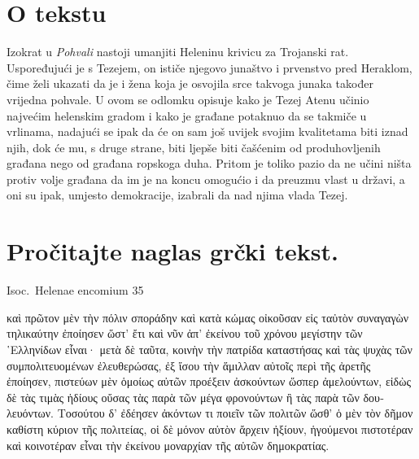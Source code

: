 


\section*{O tekstu}

Izokrat u \textit{Pohvali} nastoji umanjiti Heleninu krivicu za Trojanski rat. Uspoređujući je s Tezejem, on ističe njegovo junaštvo i prvenstvo pred Heraklom, čime želi ukazati da je i žena koja je osvojila srce takvoga junaka također vrijedna pohvale. U ovom se odlomku opisuje kako je Tezej Atenu učinio najvećim helenskim gradom i kako je građane potaknuo da se takmiče u vrlinama, nadajući se ipak da će on sam još uvijek svojim kvalitetama biti iznad njih, dok će mu, s druge strane, biti ljepše biti čašćenim od produhovljenih građana nego od građana ropskoga duha. Pritom je toliko pazio da ne učini ništa protiv volje građana da im je na koncu  omogućio i da preuzmu vlast u državi, a oni su ipak, umjesto demokracije, izabrali da nad njima vlada Tezej.


\section*{Pročitajte naglas grčki tekst.}

Isoc.\ Helenae encomium 35


\medskip

\begin{greek}
{\large

\noindent καὶ πρῶτον μὲν τὴν πόλιν σποράδην καὶ κατὰ κώμας οἰκοῦσαν εἰς ταὐτὸν συναγαγὼν τηλικαύτην ἐποίησεν ὥστ' ἔτι καὶ νῦν ἀπ' ἐκείνου τοῦ χρόνου μεγίστην τῶν ῾Ελληνίδων εἶναι· μετὰ δὲ ταῦτα, κοινὴν τὴν πατρίδα καταστήσας καὶ τὰς ψυχὰς τῶν συμπολιτευομένων ἐλευθερώσας, ἐξ ἴσου τὴν ἅμιλλαν αὐτοῖς περὶ τῆς ἀρετῆς ἐποίησεν, πιστεύων μὲν ὁμοίως αὐτῶν προέξειν ἀσκούντων ὥσπερ ἀμελούντων, εἰδὼς δὲ τὰς τιμὰς ἡδίους οὔσας τὰς παρὰ τῶν μέγα φρονούντων ἢ τὰς παρὰ τῶν δουλευόντων. Τοσούτου δ' ἐδέησεν ἀκόντων τι ποιεῖν τῶν πολιτῶν ὥσθ' ὁ μὲν τὸν δῆμον καθίστη κύριον τῆς πολιτείας, οἱ δὲ μόνον αὐτὸν ἄρχειν ἠξίουν, ἡγούμενοι πιστοτέραν καὶ κοινοτέραν εἶναι τὴν ἐκείνου μοναρχίαν τῆς αὑτῶν δημοκρατίας.


}
\end{greek}


